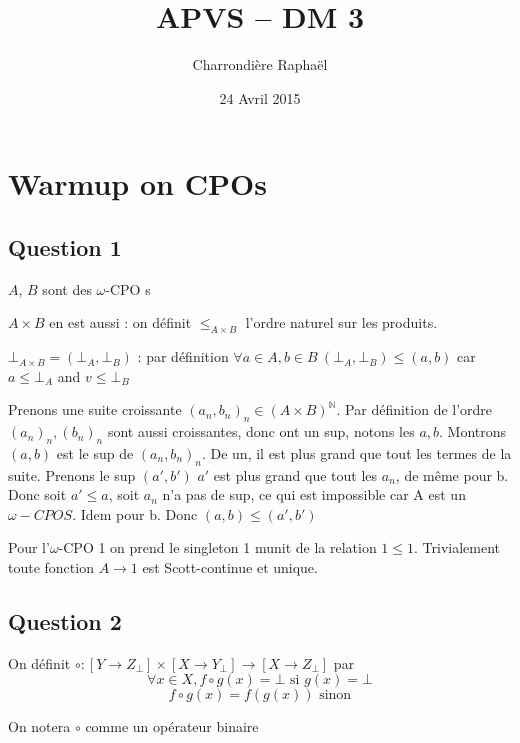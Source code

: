 \documentclass{article}
\title{APVS -- DM 3}
\author{Charrondière Raphaël}
\date{24 Avril 2015}
\newcommand{\oCPO}{$\omega$-CPO }
\begin{document}
\maketitle
\section*{Warmup on CPOs}
\subsection*{Question 1}
$A$, $B$ sont des \oCPO s

$A\times B$ en est aussi : on définit $\leq_{A\times B}$ l'ordre naturel sur les produits.

$\bot_{A\times B}=(\bot_A,\bot_B)$ : par définition $\forall a\in A,b\in B\ (\bot_A,\bot_B)\leq (a,b)$ car $a\leq\bot_A$ and $v\leq\bot_B$

Prenons une suite croissante $(a_n,b_n)_n \in (A\times B)^\mathbb{N}$. Par définition de l'ordre $(a_n)_n, (b_n)_n$ sont aussi croissantes, donc ont un sup, notons les $a,b$. Montrons $(a,b)$ est le sup de $(a_n,b_n)_n$. De un, il est plus grand que tout les termes de la suite. Prenons le sup $(a',b')$ $a'$ est plus grand que tout les $a_n$, de même pour b. Donc soit $a'\leq a$, soit $a_n$ n'a pas de sup, ce qui est impossible car A est un $\omega-CPOS$. Idem pour  b. Donc $(a,b)\leq (a',b')$

Pour l'\oCPO 1 on prend le singleton {1} munit de la relation $1\leq 1$. Trivialement toute fonction $A \rightarrow 1$ est Scott-continue et unique.

\subsection*{Question 2}
On définit $\circ : [Y \rightarrow Z_\bot] \times [X \rightarrow Y_\bot] \rightarrow [X \rightarrow Z_\bot]$ par 
$$\forall x \in X,  f\circ g(x) = \bot \text{ si } g(x) = \bot $$  $$f\circ g(x) =f(g(x)) \text{ sinon}$$

On notera $\circ$ comme un opérateur binaire
\end{document}

